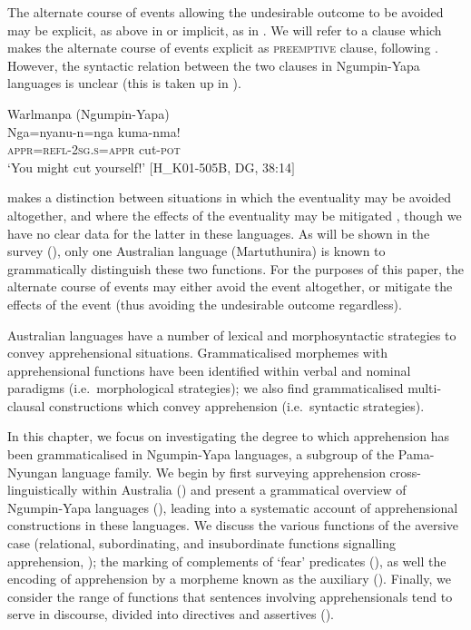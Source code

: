 \documentclass[output=paper,colorlinks,citecolor=brown]{langscibook}
\begin{document}
 The alternate course of events allowing the undesirable outcome to be avoided may be explicit, as above in  or implicit, as in . We will refer to a clause which makes the alternate course of events explicit as \textsc{preemptive} clause, following \citet[265]{evans_current_1995}. However, the syntactic relation between the two clauses in Ngumpin-Yapa languages is unclear (this is taken up in ).

\ea 
\textnormal{Warlmanpa (Ngumpin-Yapa)}\\
\gll Nga=nyanu-n=nga kuma-nma! \\
\textsc{appr=refl-2sg.s=appr} cut-\textsc{pot} \\
\glt `You might cut yourself!' $[$H\_K01-505B, DG, 38:14$]$ \\
\label{ex:bro2}
\z

 \citeauthor{lichtenberk_apprehensional_1995} makes a distinction between situations in which the eventuality may be avoided altogether, and where the effects of the eventuality may be mitigated \citep[297]{lichtenberk_apprehensional_1995}, though we have no clear data for the latter in these languages. As will be shown in the survey (), only one Australian language (Martuthunira) is known to grammatically distinguish these two functions. For the purposes of this paper, the alternate course of events may either avoid the event altogether, or mitigate the effects of the event (thus avoiding the undesirable outcome regardless).

Australian languages have a number of lexical and morphosyntactic strategies to convey apprehensional situations. Grammaticalised morphemes with apprehensional functions have been identified within verbal and nominal paradigms (i.e.\  morphological strategies); we also find grammaticalised multi-clausal constructions which convey apprehension (i.e.\  syntactic strategies).

In this chapter, we focus on investigating the degree to which apprehension has been grammaticalised in Ngumpin-Yapa languages, a subgroup of the Pama-Nyungan language family. We begin by first surveying apprehension cross-linguistically within Australia () and present a grammatical overview of Ngumpin-Yapa languages (), leading into a systematic account of apprehensional constructions in these languages. We discuss the various functions of the aversive case (relational, subordinating, and insubordinate functions signalling apprehension, ); the marking of complements of `fear' predicates (), as well the encoding of apprehension by a morpheme known as the auxiliary (). Finally, we consider the range of functions that sentences involving apprehensionals tend to serve in discourse, divided into directives and assertives (). 
\end{document}
